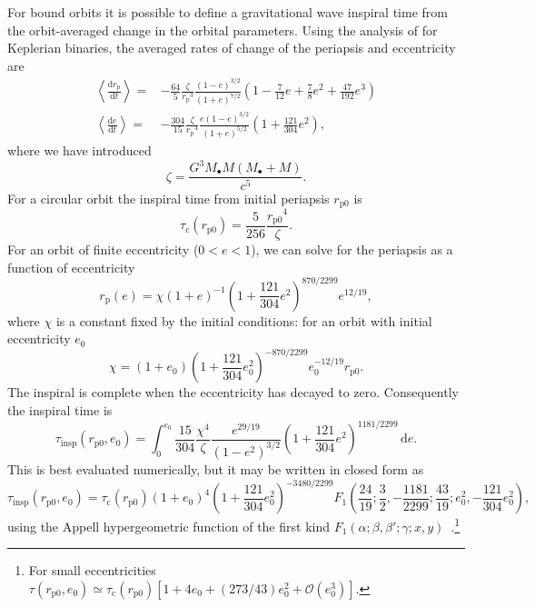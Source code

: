 \documentclass[useAMS,usedcolumn,usegraphicx,usenatbib]{mn2e}
\newcommand{\sub}[1]{\ensuremath{_\mathrm{#1}}}
\newcommand{\dd}{\ensuremath{\mathrm{d}}}
\newcommand{\diff}[2]{\ensuremath{\frac{\dd {#1}}{\dd {#2}}}}
\newcommand{\intd}[4]{\ensuremath{\displaystyle \int_{#1}^{#2}{#3}\,\dd{#4}}}
\newcommand{\order}[1]{\ensuremath{\mathcal{O}({#1})}}
\begin{document}
\begin{onecolumn}
For bound orbits it is possible to define a gravitational wave inspiral time from the orbit-averaged change in the orbital parameters. Using the analysis of \citet{Peters1964} for Keplerian binaries, the averaged rates of change of the periapsis and eccentricity are
\begin{align}
\left\langle\diff{r\sub{p}}{t}\right\rangle = {} & -\frac{64}{5}\frac{\zeta}{r\sub{p}^3}\frac{(1 - e)^{3/2}}{(1 + e)^{7/2}}\left(1 - \frac{7}{12}e + \frac{7}{8}e^2 + \frac{47}{192}e^3\right) \\
\left\langle\diff{e}{t}\right\rangle = {} & -\frac{304}{15}\frac{\zeta}{r\sub{p}^4}\frac{e(1 - e)^{3/2}}{(1 + e)^{5/2}}\left(1 + \frac{121}{304}e^2\right),
\end{align}
where we have introduced
\begin{equation}
\zeta = \frac{G^3M_\bullet M(M_\bullet + M)}{c^5}.
\end{equation}
For a circular orbit the inspiral time from initial periapsis $r\sub{p0}$ is
\begin{equation}
\tau\sub{c}(r\sub{p0}) = \frac{5}{256}\frac{r\sub{p0}^4}{\zeta}.
\end{equation}
For an orbit of finite eccentricity ($0 < e < 1$), we can solve for the periapsis as a function of eccentricity
\begin{equation}
r\sub{p}(e) = \chi(1 + e)^{-1}\left(1 + \frac{121}{304}e^2\right)^{870/2299}e^{12/19},
\end{equation}
where $\chi$ is a constant fixed by the initial conditions: for an orbit with initial eccentricity $e_0$
\begin{equation}
\chi = (1 + e_0)\left(1 + \frac{121}{304}e_0^2\right)^{-870/2299}e_0^{-12/19}r\sub{p0}.
\end{equation}
The inspiral is complete when the eccentricity has decayed to zero. Consequently the inspiral time is~\citep{Peters1964}
\begin{equation}
\tau\sub{insp}(r\sub{p0},e_0) = \intd{0}{e_0}{\frac{15}{304}\frac{\chi^4}{\zeta}\frac{e^{29/19}}{(1-e^2)^{3/2}}\left(1 + \frac{121}{304}e^2\right)^{1181/2299}}{e}.
\end{equation}
This is best evaluated numerically, but it may be written in closed form as
\begin{equation}
\tau\sub{insp}(r\sub{p0},e_0) = \tau\sub{c}(r\sub{p0})(1 + e_0)^4\left(1 + \frac{121}{304}e_0^2\right)^{-3480/2299} F_1\left(\frac{24}{19};\frac{3}{2},-\frac{1181}{2299};\frac{43}{19};e_0^2,-\frac{121}{304}e_0^2\right),
\label{eq:Bound_inspiral}
\end{equation}
using the Appell hypergeometric function of the first kind $F_1(\alpha;\beta,\beta';\gamma;x,y)$~\citep[16.15.1]{Olver2010}.\footnote{For small eccentricities $\tau(r\sub{p0},e_0) \simeq \tau\sub{c}(r\sub{p0})[1 + 4e_0 + (273/43)e_0^2 + \order{e_0^3}]$.}


\end{onecolumn}
\end{document}
